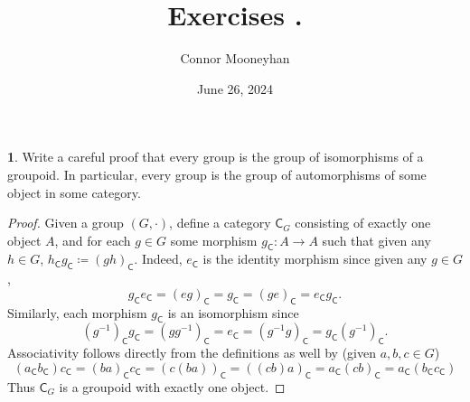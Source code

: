 \documentclass{article}
\title{Exercises {\Roman{chapter}}.{\arabic{section}}}
\author{Connor Mooneyhan}
\date{June 26, 2024}
\theoremstyle{definition}
\newtheorem{ex}{}[section]
\begin{document}
\maketitle

\begin{ex}
	Write a careful proof that every group is the group of isomorphisms of a groupoid.
	In particular, every group is the group of automorphisms of some object in some category.
\end{ex}
\begin{proof}
	Given a group $(G, \cdot)$, define a category $\mathsf{C}_G$ consisting of exactly one object $A$, and for each $g \in G$ some morphism $g_{\mathsf{C}} : A \to A$ such that given any $h \in G$, $h_{\mathsf{C}}g_{\mathsf{C}} \coloneq (gh)_{\mathsf{C}}$.
	Indeed, $e_{\mathsf{C}}$ is the identity morphism since given any $g \in G$, \begin{equation*}
		g_{\mathsf{C}}e_{\mathsf{C}} = (eg)_{\mathsf{C}} = g_{\mathsf{C}} = (ge)_{\mathsf{C}} = e_{\mathsf{C}}g_{\mathsf{C}}.
	\end{equation*}
	Similarly, each morphism $g_{\mathsf{C}}$ is an isomorphism since \begin{equation*}
		(g^{-1})_{\mathsf{C}}g_{\mathsf{C}} = (gg^{-1})_{\mathsf{C}} = e_{\mathsf{C}} = (g^{-1}g)_{\mathsf{C}} = g_{\mathsf{C}}(g^{-1})_{\mathsf{C}}.
	\end{equation*}
	Associativity follows directly from the definitions as well by (given $a, b, c \in G$) \begin{equation*}
		(a_{\mathsf{C}}b_{\mathsf{C}})c_{\mathsf{C}} = (ba)_{\mathsf{C}}c_{\mathsf{C}} = (c(ba))_{\mathsf{C}} = ((cb)a)_{\mathsf{C}} = a_{\mathsf{C}}(cb)_{\mathsf{C}} = a_{\mathsf{C}}(b_{\mathsf{C}}c_{\mathsf{C}})
	\end{equation*}
	Thus $\mathsf{C}_G$ is a groupoid with exactly one object.
\end{proof}
\end{document}
